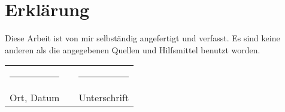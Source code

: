 \clearpage
\chapter*{Erklärung}\label{erklaerung}
\thispagestyle{empty}

Diese Arbeit ist von mir selbständig angefertigt und verfasst. Es sind keine anderen als die angegebenen Quellen und Hilfsmittel benutzt worden.

     
\vspace{1cm}

\begin{tabularx}{\textwidth}{lXl}
  \rule{5cm}{0.4pt} & & \rule{5cm}{0.4pt}\\
  Ort, Datum & & Unterschrift
\end{tabularx}
